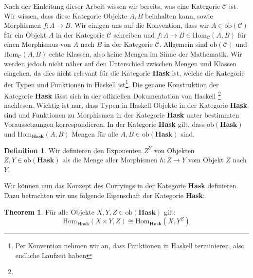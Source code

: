 \documentclass{hhuarticle}
\theoremstyle{definition}
\newtheorem{definition}{Definition}[section]
\theoremstyle{theorem}
\newtheorem{theorem}{Theorem}[section]
\begin{document}
  Nach der Einleitung dieser Arbeit wissen wir bereits, was eine
  Kategorie $\mathcal{C}$ ist. Wir wissen, dass diese Kategorie
  Objekte $A, B$ beinhalten kann, sowie Morphismen $f:A\rightarrow B$.
  Wir einigen uns auf die Konvention, dass wir $A\in \text{ob}(\mathcal{C})$
  für ein Objekt $A$ in der Kategorie $\mathcal{C}$ schreiben und
  $f:A\rightarrow B \in \text{Hom}_\mathcal{C}(A, B)$ für
  einen Morphismus von $A$ nach $B$ in der Kategorie $\mathcal{C}$.
  Allgemein sind $\text{ob}(\mathcal{C})$ und $\text{Hom}_\mathcal{C}(A, B)$
  echte Klassen, also keine Mengen im Sinne der Mathematik.
  Wir werden jedoch nicht näher auf den Unterschied zwischen
  Mengen und Klassen eingehen, da dies nicht relevant für die
  Kategorie \textbf{Hask} ist, welche die Kategorie der Typen und 
  Funktionen in Haskell ist\footnote{Per Konvention nehmen wir an,
  dass Funktionen in Haskell terminieren, also endliche Laufzeit haben}.
  Die genaue Konstruktion der Kategorie \textbf{Hask}
  lässt sich in der offiziellen Dokumentation von Haskell
  \footnote{}
  nachlesen. Wichtig ist nur, dass Typen in Haskell Objekte in der
  Kategorie \textbf{Hask} sind und Funktionen zu Morphismen in der
  Kategorie \textbf{Hask} unter bestimmten Voraussetzungen korrespondieren.
  In der Kategorie \textbf{Hask} gilt, dass $\text{ob}(\textbf{Hask})$
  und $\text{Hom}_\textbf{Hask}(A, B)$ Mengen für alle $A, B \in \text{ob}(\textbf{Hask})$ sind.

  \begin{definition}
    Wir definieren den Exponenten $Z^Y$ von Objekten $Z, Y\in \text{ob}(\textbf{Hask})$
    als die Menge aller Morphismen $h: Z \to Y$ vom Objekt $Z$ nach $Y$.
  \end{definition}

  Wir können nun das Konzept des Curryings in der Kategorie \textbf{Hask}
  definieren. Dazu betrachten wir uns folgende Eigenschaft der Kategorie
  \textbf{Hask}:

  \begin{theorem}
    Für alle Objekte $X, Y, Z \in \text{ob}(\textbf{Hask})$ gilt:
    \begin{equation}
      \text{Hom}_\textbf{Hask}(X \times Y, Z) \cong \text{Hom}_\textbf{Hask}(X, Y^Z)
    \end{equation}
  \end{theorem}
\end{document}

